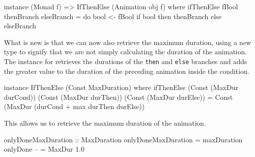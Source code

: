 \begin{code}
instance (Monad f) => IfThenElse (Animation obj f) where
  ifThenElse fBool thenBranch elseBranch = do
    bool <- fBool
    if bool then thenBranch else elseBranch
\end{code}

What is new is that we can now also retrieve the maximum duration, using a new type
 to signify that we are not simply calculating the duration of
the animation. The instance for  retrieves the
durations of the \texttt{then} and \texttt{else} branches and adds the greater
value to the duration of the preceding animation inside the condition.

\begin{code}
instance IfThenElse (Const MaxDuration) where
  ifThenElse (Const (MaxDur durCond)) (Const (MaxDur durThen))
             (Const (MaxDur durElse)) =
    Const (MaxDur (durCond + max durThen durElse))
\end{code}

This allows us to retrieve the maximum duration of the  animation.

\begin{spec}
onlyDoneMaxDuration :: MaxDuration
onlyDoneMaxDuration = maxDuration onlyDone -- = MaxDur 1.0
\end{spec}
